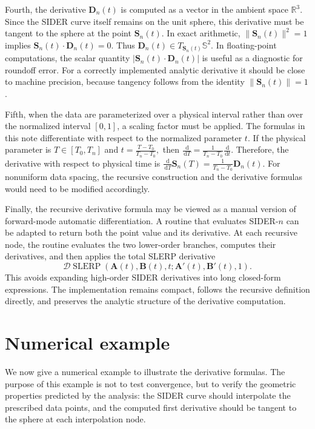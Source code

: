 \documentclass[a4paper,11pt]{article}
\newcommand{\bA}{\mathbf{A}}
\newcommand{\bB}{\mathbf{B}}
\newcommand{\bD}{\mathbf{D}}
\numberwithin{equation}{section}
\theoremstyle{plain}
\theoremstyle{definition}
\theoremstyle{remark}
\newcommand{\Sph}{\mathbb{S}^2}
\newcommand{\slerp}{\operatorname{SLERP}}
\newcommand{\dd}{\,\mathrm{d}}
\begin{document}
Fourth, the derivative $\bD_n(t)$ is computed as a vector in the ambient space $\mathbb{R}^3$.  Since the SIDER curve itself remains on the unit sphere, this derivative must be tangent to the sphere at the point $\mathbf{S}_n(t)$.  In exact arithmetic,
\(\|\mathbf{S}_n(t)\|^2=1\)
implies
\(\mathbf{S}_n(t)\cdot \bD_n(t)=0.\)
Thus
\(\bD_n(t)\in T_{\mathbf{S}_n(t)}\Sph.\)
In floating-point computations, the scalar quantity \(|\mathbf{S}_n(t)\cdot\bD_n(t)|\) is useful as a diagnostic for roundoff error.  For a correctly implemented analytic derivative it should be close to machine precision, because tangency follows from the identity \(\|\mathbf{S}_n(t)\|=1\).

Fifth, when the data are parameterized over a physical interval rather than over the normalized interval $[0,1]$, a scaling factor must be applied.  The formulas in this note differentiate with respect to the normalized parameter $t$.  If the physical parameter is $T\in[T_0,T_n]$ and
\(t=\frac{T-T_0}{T_n-T_0},\)
then
\(\frac{\dd}{\dd T} = \frac{1}{T_n-T_0} \frac{\dd}{\dd t}.\)
Therefore, the derivative with respect to physical time is
\(\frac{\dd}{\dd T}\mathbf{S}_n(T) = \frac{1}{T_n-T_0}\bD_n(t).\)
For nonuniform data spacing, the recursive construction and the derivative formulas would need to be modified accordingly.

Finally, the recursive derivative formula may be viewed as a manual version of forward-mode automatic differentiation.  A routine that evaluates SIDER-$n$ can be adapted to return both the point value and its derivative.  At each recursive node, the routine evaluates the two lower-order branches, computes their derivatives, and then applies the total SLERP derivative
\[
        \mathcal{D}\slerp
        \left(
        \bA(t),\bB(t),t;
        \bA'(t),\bB'(t),1
        \right).
\]
This avoids expanding high-order SIDER derivatives into long closed-form expressions.  The implementation remains compact, follows the recursive definition directly, and preserves the analytic structure of the derivative computation.

\section{Numerical example}\label{sec:numerical-example}

We now give a numerical example to illustrate the derivative formulas.  The purpose of this example is not to test convergence, but to verify the geometric properties predicted by the analysis: the SIDER curve should interpolate the prescribed data points, and the computed first derivative should be tangent to the sphere at each interpolation node.
\end{document}
